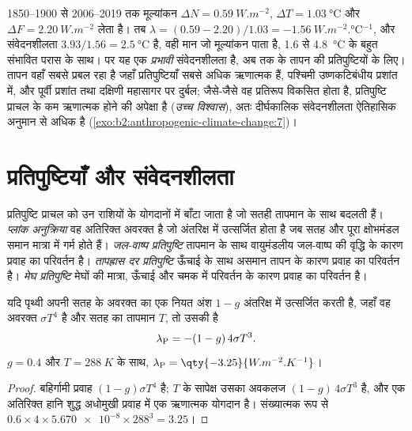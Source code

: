 1850--1900 से 2006--2019 तक मूल्यांकन $\Delta N = \qty{0.59}{W.m^{-2}}$, $\Delta T =
\qty{1.03}{\celsius}$ और $\Delta F = \qty{2.20}{W.m^{-2}}$ लेता है। तब $\lambda = (0.59 - 2.20)/1.03 =
\qty{-1.56}{W.m^{-2}.\celsius^{-1}}$, और संवेदनशीलता $3.93/1.56 = \qty{2.5}{\celsius}$ है,
वही मान जो मूल्यांकन पाता है, 1.6 से \qty{4.8}{\celsius} के बहुत संभावित परास के साथ। पर यह
एक \emph{प्रभावी} संवेदनशीलता है, अब तक के तापन की प्रतिपुष्टियों के लिए। तापन वहाँ
सबसे प्रबल रहा है जहाँ प्रतिपुष्टियाँ सबसे अधिक ऋणात्मक हैं, पश्चिमी उष्णकटिबंधीय प्रशांत में, और
पूर्वी प्रशांत तथा दक्षिणी महासागर पर दुर्बल; जैसे-जैसे वह प्रतिरूप विकसित होता है, प्रतिपुष्टि प्राचल के
कम ऋणात्मक होने की अपेक्षा है (\emph{उच्च विश्वास}), अतः दीर्घकालिक संवेदनशीलता ऐतिहासिक
अनुमान से अधिक है (\cref{exo:b2:anthropogenic-climate-change:7})।

\section{प्रतिपुष्टियाँ और संवेदनशीलता}\label{sec:b2:anthropogenic-climate-change:feedbacks}

\begin{definition}[प्लांक अनुक्रिया; जल-वाष्प, तापह्रास दर और मेघ प्रतिपुष्टियाँ]\label{def:b2:anthropogenic-climate-change:feedbacks}
प्रतिपुष्टि प्राचल को उन राशियों के योगदानों में बाँटा जाता है जो सतही तापमान के साथ बदलती हैं।
\emph{प्लांक अनुक्रिया} वह अतिरिक्त अवरक्त है
जो अंतरिक्ष में उत्सर्जित होता है जब सतह और पूरा क्षोभमंडल समान मात्रा में गर्म होते हैं।
\emph{जल-वाष्प प्रतिपुष्टि} तापमान के साथ वायुमंडलीय जल-वाष्प की वृद्धि
के कारण प्रवाह का परिवर्तन है। \emph{तापह्रास दर
प्रतिपुष्टि} ऊँचाई के साथ असमान तापन के कारण प्रवाह का परिवर्तन है। \emph{मेघ
प्रतिपुष्टि} मेघों की मात्रा, ऊँचाई और
चमक में परिवर्तन के कारण प्रवाह का परिवर्तन है।
\end{definition}

\begin{proposition}[प्लांक अनुक्रिया]\label{prop:b2:anthropogenic-climate-change:planck}
यदि पृथ्वी अपनी सतह के अवरक्त का एक नियत अंश $1 - g$ अंतरिक्ष में उत्सर्जित करती है, जहाँ वह अवरक्त
$\sigma T^4$ है और सतह का तापमान $T$, तो उसकी  है
\[
  \lambda_{\text P} = -(1 - g)\,4\sigma T^3 .
\]
$g = 0.4$ और $T = \qty{288}{K}$ के साथ, $\lambda_{\text P} = \qty{-3.25}{W.m^{-2}.K^{-1}}$।
\end{proposition}
\begin{proof}
बहिर्गामी प्रवाह $(1 - g)\sigma T^4$ है; $T$ के सापेक्ष उसका अवकलज $(1 - g)\,4\sigma
T^3$ है, और एक अतिरिक्त हानि शुद्ध अधोमुखी प्रवाह में एक ऋणात्मक योगदान है। संख्यात्मक रूप से $0.6
\times 4 \times \num{5.670e-8} \times 288^3 = 3.25$।
\end{proof}

